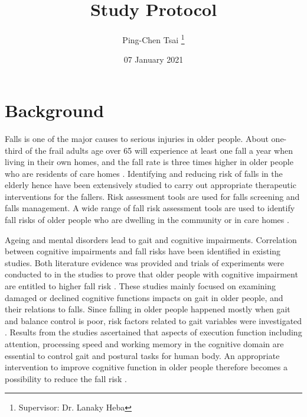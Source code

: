 \documentclass{article}
\title{Study Protocol}
\author{Ping-Chen Tsai  \thanks{Supervisor: Dr. Lanaky Heba}}
\date{07 January 2021}
\begin{document}
\maketitle

\tableofcontents
\pagebreak


\section{Background}
\begin{comment}
Aim: To place the study in the context of available evidence.
The background should be supported by appropriate references to published literature on the area of interest:
•	A thorough literature review of relevant studies and analysis, new research should build on formal review of prior evidence.
•	A brief description of the proposed study.
•	A description of the population to be studied.
•	relevant data from previous clinical trials such as efficacy, safety, tolerability

It should be written so it is easy to read and understand by someone with a basic sense of the topic who may not necessarily be an expert in the area. Some explanation of terms and concepts is likely to be beneficial. 
\end{comment}

Falls is one of the major causes to serious injuries in older people. About one-third of the frail adults age over 65 will experience at least one fall a year when living in their own homes, and the fall rate is three times higher in older people who are residents of care homes \cite{NHSFalls_2018, Robertson_2013}. Identifying and reducing risk of falls in the elderly hence have been extensively studied to carry out appropriate therapeutic interventions for the fallers. Risk assessment tools are used for falls screening and falls management. A wide range of fall risk assessment tools are used to identify fall risks of older people who are dwelling in the community \cite{PreventionofFalls2011} or in care homes \cite{Jung_2014, Kikkert_2017}. 

Ageing and mental disorders lead to gait and cognitive impairments. Correlation between cognitive impairments and fall risks have been identified in existing studies. Both literature evidence was provided and trials of experiments were conducted to in the studies to prove that older people with cognitive impairment are entitled to higher fall risk \cite{Yogev_Seligmann_2007,Martin_2012,Laurence_2017, Zhang_2019}. These studies mainly focused on examining damaged or declined cognitive functions impacts on gait in older people, and their relations to falls. Since falling in older people happened mostly when gait and balance control is poor, risk factors related to gait variables were investigated \cite{Zhang_2019, Mirelman_2012, Borowicz_2016}. Results from the studies ascertained that aspects of execution function including attention, processing speed and working memory in the cognitive domain are essential to control gait and postural tasks for human body. An appropriate intervention to improve cognitive function in older people therefore becomes a possibility to reduce the fall risk \cite{Barban_2017}. 
\end{document}
